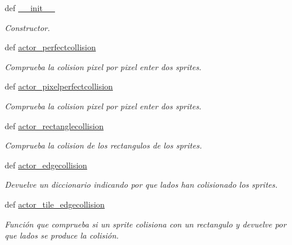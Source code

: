 \begin{DoxyCompactItemize}
\item 
\hypertarget{classengine_1_1collisionmanager_1_1CollisionManager_aedef5b60e3fcbe21187f3a0d2c9fbe46}{
def \hyperlink{classengine_1_1collisionmanager_1_1CollisionManager_aedef5b60e3fcbe21187f3a0d2c9fbe46}{\-\_\-\-\_\-init\-\_\-\-\_\-}}
\label{classengine_1_1collisionmanager_1_1CollisionManager_aedef5b60e3fcbe21187f3a0d2c9fbe46}

\begin{DoxyCompactList}\small\item\em \-Constructor. \end{DoxyCompactList}\item 
def \hyperlink{classengine_1_1collisionmanager_1_1CollisionManager_a72c326a45477aabc0dbde196fd8a1302}{actor\-\_\-perfectcollision}
\begin{DoxyCompactList}\small\item\em \-Comprueba la colision pixel por pixel enter dos sprites. \end{DoxyCompactList}\item 
def \hyperlink{classengine_1_1collisionmanager_1_1CollisionManager_a4f9754141bccab6c28d2f0dc5e26de26}{actor\-\_\-pixelperfectcollision}
\begin{DoxyCompactList}\small\item\em \-Comprueba la colision pixel por pixel enter dos sprites. \end{DoxyCompactList}\item 
def \hyperlink{classengine_1_1collisionmanager_1_1CollisionManager_a2bb0e7ebbb5d2252a71f1176718da371}{actor\-\_\-rectanglecollision}
\begin{DoxyCompactList}\small\item\em \-Comprueba la colision de los rectangulos de los sprites. \end{DoxyCompactList}\item 
def \hyperlink{classengine_1_1collisionmanager_1_1CollisionManager_ab653463e11beda6d3410bf92172c899b}{actor\-\_\-edgecollision}
\begin{DoxyCompactList}\small\item\em \-Devuelve un diccionario indicando por que lados han colisionado los sprites. \end{DoxyCompactList}\item 
def \hyperlink{classengine_1_1collisionmanager_1_1CollisionManager_ade97e560cb0b5006079add21068e5a1e}{actor\-\_\-tile\-\_\-edgecollision}
\begin{DoxyCompactList}\small\item\em \-Función que comprueba si un sprite colisiona con un rectangulo y devuelve por que lados se produce la colisión. \end{DoxyCompactList}\item 

\end{DoxyCompactItemize}
